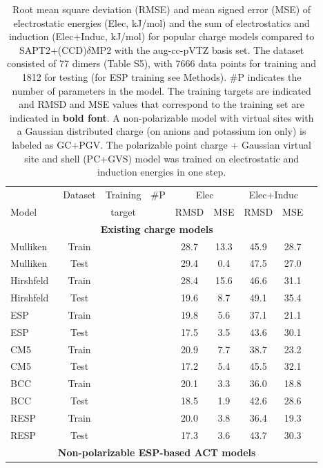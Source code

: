 \begin{table}[htb]
\centering
\caption{Root mean square deviation (RMSE) and mean signed error (MSE) of electrostatic energies (Elec, kJ/mol) and the sum of electrostatics and induction (Elec+Induc, kJ/mol) for popular charge models compared to SAPT2+(CCD)$\delta$MP2 with the aug-cc-pVTZ basis set. The dataset consisted of 77 dimers (Table S5), with 7666 data points for training and 1812 for testing (for ESP training see Methods). \#P indicates the number of parameters in the model. The training targets are indicated and RMSD and MSE values that correspond to the training set are indicated in {\bf bold font}. A non-polarizable model with virtual sites with a Gaussian distributed charge (on anions and potassium ion only) is labeled as GC+PGV. The polarizable point charge + Gaussian virtual site and shell (PC+GVS) model was trained on electrostatic and induction energies in one step.}
\label{legacy}
\begin{tabular}{lcccccccc}
\hline
 & Dataset & Training & \#P & \multicolumn{2}{c}{Elec}  & \multicolumn{2}{c}{Elec+Induc}\\
Model & & target & & RMSD & MSE & RMSD & MSE \\
\hline
\multicolumn{8}{c}{\bf Existing charge models}\\
Mulliken~\cite{Mulliken1955a} & Train & &  & 28.7 & 13.3 & 45.9 & 28.7 \\
Mulliken & Test & &  & 29.4 & 0.4 & 47.5 & 27.0 \\
Hirshfeld~\cite{Hirshfeld1977a} & Train & &  & 28.4 & 15.6 & 46.6 & 31.1 \\
Hirshfeld & Test & &  & 19.6 & 8.7 & 49.1 & 35.4 \\
ESP~\cite{Besler1990a} & Train & &  & 19.8 & 5.6 & 37.1 & 21.1 \\
ESP & Test & &  & 17.5 & 3.5 & 43.6 & 30.1 \\
CM5~\cite{Marenich2012a} & Train & &  & 20.9 & 7.7 & 38.7 & 23.2 \\
CM5 & Test & &  & 17.2 & 5.4 & 45.5 & 32.1 \\
BCC~\cite{Jakalian2000a} & Train & &  & 20.1 & 3.3 & 36.0 & 18.8 \\
BCC & Test & &  & 18.5 & 1.9 & 42.6 & 28.6 \\
RESP~\cite{Bayly1993a} & Train & &  & 20.0 & 3.8 & 36.4 & 19.3 \\
RESP & Test & &  & 17.3 & 3.6 & 43.7 & 30.3 \\
\hline
\multicolumn{8}{c}{\bf Non-polarizable ESP-based ACT models}\\

\end{tabular}
\end{table}
